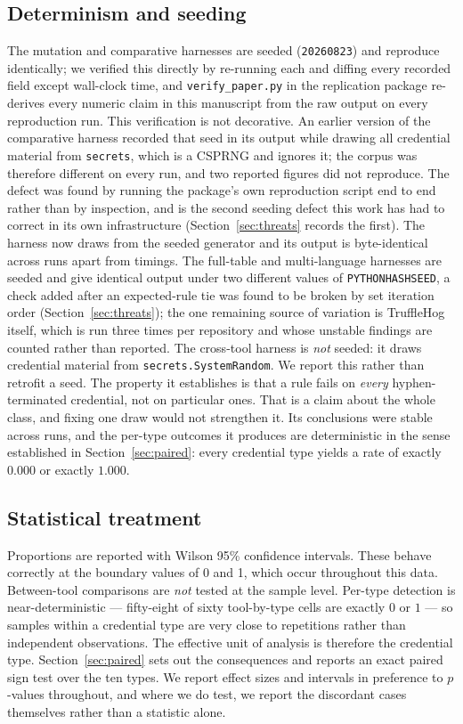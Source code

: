 \documentclass[pdflatex,sn-basic]{sn-jnl}
\begin{document}
\subsection{Determinism and seeding}

The mutation and comparative harnesses are seeded (\texttt{20260823}) and reproduce identically; we verified this directly by re-running each and diffing every recorded field except wall-clock time, and \texttt{verify\_paper.py} in the replication package re-derives every numeric claim in this manuscript from the raw output on every reproduction run. This verification is not decorative. An earlier version of the comparative harness recorded that seed in its output while drawing all credential material from \texttt{secrets}, which is a CSPRNG and ignores it; the corpus was therefore different on every run, and two reported figures did not reproduce. The defect was found by running the package's own reproduction script end to end rather than by inspection, and is the second seeding defect this work has had to correct in its own infrastructure (Section~\ref{sec:threats} records the first). The harness now draws from the seeded generator and its output is byte-identical across runs apart from timings. The full-table and multi-language harnesses are seeded and give identical output under two different values of \texttt{PYTHONHASHSEED}, a check added after an expected-rule tie was found to be broken by set iteration order (Section~\ref{sec:threats}); the one remaining source of variation is TruffleHog itself, which is run three times per repository and whose unstable findings are counted rather than reported. The cross-tool harness is \emph{not} seeded: it draws credential material from \texttt{secrets.SystemRandom}. We report this rather than retrofit a seed. The property it establishes is that a rule fails on \emph{every} hyphen-terminated credential, not on particular ones. That is a claim about the whole class, and fixing one draw would not strengthen it. Its conclusions were stable across runs, and the per-type outcomes it produces are deterministic in the sense established in Section~\ref{sec:paired}: every credential type yields a rate of exactly $0.000$ or exactly $1.000$.

\subsection{Statistical treatment}

Proportions are reported with Wilson 95\% confidence intervals. These behave correctly at the boundary values of 0 and 1, which occur throughout this data. Between-tool comparisons are \emph{not} tested at the sample level. Per-type detection is near-deterministic --- fifty-eight of sixty tool-by-type cells are exactly $0$ or $1$ --- so samples within a credential type are very close to repetitions rather than independent observations. The effective unit of analysis is therefore the credential type. Section~\ref{sec:paired} sets out the consequences and reports an exact paired sign test over the ten types. We report effect sizes and intervals in preference to $p$-values throughout, and where we do test, we report the discordant cases themselves rather than a statistic alone.
\end{document}
